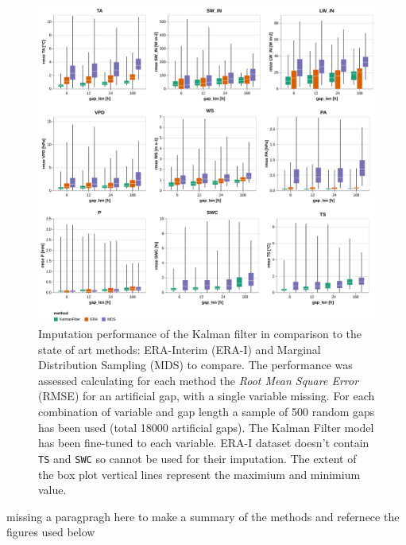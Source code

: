 \documentclass{article}
\newcommand{\imgwidth}{6in}
\begin{document}
\begin{figure}
    \centerline{\includegraphics[width=\imgwidth]{the_plot}}
\caption{ Imputation performance of the Kalman filter in comparison to the state of art methods: ERA-Interim (ERA-I) and Marginal Distribution Sampling (MDS) to compare. The performance was assessed calculating for each method the \textit{Root Mean Square Error} (RMSE) for an artificial gap, with a single variable missing. For each combination of variable and gap length a sample of 500 random gaps has been used (total 18000 artificial gaps).
The Kalman Filter model has been fine-tuned to each variable. ERA-I dataset doesn't contain \texttt{TS} and \texttt{SWC} so cannot be used for their imputation. The extent of the box plot vertical lines represent the maximium and minimium value.}
\label{fig:the_plot}
\end{figure}




missing a paragpragh here to make a summary of the methods and refernece the figures used below
\end{document}

